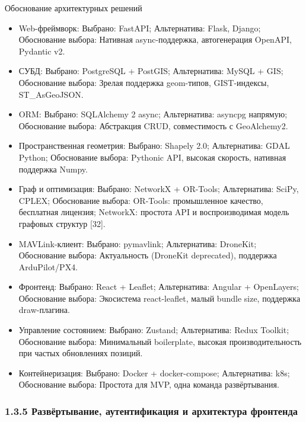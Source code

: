 \documentclass[14pt,a4paper]{extarticle}
\begin{document}
Обоснование архитектурных решений
\begin{itemize}
\item Web-фреймворк: Выбрано: FastAPI; Альтернатива: Flask, Django; Обоснование выбора: Нативная async-поддержка, автогенерация OpenAPI, Pydantic v2.
\item СУБД: Выбрано: PostgreSQL + PostGIS; Альтернатива: MySQL + GIS; Обоснование выбора: Зрелая поддержка geom-типов, GIST-индексы, ST\_AsGeoJSON.
\item ORM: Выбрано: SQLAlchemy 2 async; Альтернатива: asyncpg напрямую; Обоснование выбора: Абстракция CRUD, совместимость с GeoAlchemy2.
\item Пространственная геометрия: Выбрано: Shapely 2.0; Альтернатива: GDAL Python; Обоснование выбора: Pythonic API, высокая скорость, нативная поддержка Numpy.
\item Граф и оптимизация: Выбрано: NetworkX + OR-Tools; Альтернатива: SciPy, CPLEX; Обоснование выбора: OR-Tools: промышленное качество, бесплатная лицензия; NetworkX: простота API и воспроизводимая модель графовых структур [32].
\item MAVLink-клиент: Выбрано: pymavlink; Альтернатива: DroneKit; Обоснование выбора: Актуальность (DroneKit deprecated), поддержка ArduPilot/PX4.
\item Фронтенд: Выбрано: React + Leaflet; Альтернатива: Angular + OpenLayers; Обоснование выбора: Экосистема react-leaflet, малый bundle size, поддержка draw-плагина.
\item Управление состоянием: Выбрано: Zustand; Альтернатива: Redux Toolkit; Обоснование выбора: Минимальный boilerplate, высокая производительность при частых обновлениях позиций.
\item Контейнеризация: Выбрано: Docker + docker-compose; Альтернатива: k8s; Обоснование выбора: Простота для MVP, одна команда развёртывания.
\end{itemize}


\hypertarget{ux440ux430ux437ux432ux451ux440ux442ux44bux432ux430ux43dux438ux435-ux430ux443ux442ux435ux43dux442ux438ux444ux438ux43aux430ux446ux438ux44f-ux438-ux430ux440ux445ux438ux442ux435ux43aux442ux443ux440ux430-ux444ux440ux43eux43dux442ux435ux43dux434ux430}{%
\subsubsection{1.3.5 Развёртывание, аутентификация и архитектура фронтенда}\label{ux440ux430ux437ux432ux451ux440ux442ux44bux432ux430ux43dux438ux435-ux430ux443ux442ux435ux43dux442ux438ux444ux438ux43aux430ux446ux438ux44f-ux438-ux430ux440ux445ux438ux442ux435ux43aux442ux443ux440ux430-ux444ux440ux43eux43dux442ux435ux43dux434ux430}}
\end{document}
